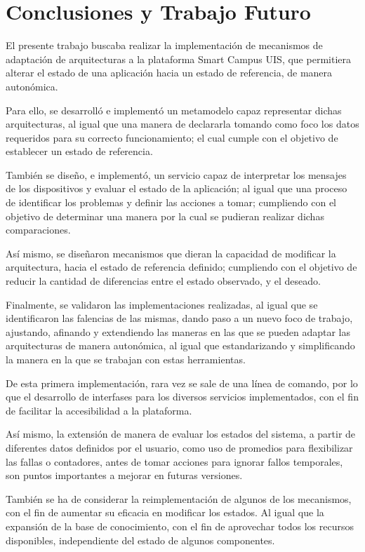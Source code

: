\newpage
\section{Conclusiones y Trabajo Futuro} \label{sec:future}

El presente trabajo buscaba realizar la implementación de mecanismos de adaptación de arquitecturas a la plataforma Smart Campus UIS, que permitiera alterar el estado de una aplicación hacia un estado de referencia, de manera autonómica.

Para ello, se desarrolló e implementó un metamodelo capaz representar dichas arquitecturas, al igual que una manera de declararla tomando como foco los datos requeridos para su correcto funcionamiento; el cual cumple con el objetivo de establecer un estado de referencia.

También se diseño, e implementó, un servicio capaz de interpretar los mensajes de los dispositivos y evaluar el estado de la aplicación; al igual que una proceso de identificar los problemas y definir las acciones a tomar; cumpliendo con el objetivo de determinar una manera por la cual se pudieran realizar dichas comparaciones.

Así mismo, se diseñaron mecanismos que dieran la capacidad de modificar la arquitectura, hacia el estado de referencia definido; cumpliendo con el objetivo de reducir la cantidad de diferencias entre el estado observado, y el deseado.

Finalmente, se validaron las implementaciones realizadas, al igual que se identificaron las falencias de las mismas, dando paso a un nuevo foco de trabajo, ajustando, afinando y extendiendo las maneras en las que se pueden adaptar las arquitecturas de manera autonómica, al igual que estandarizando y simplificando la manera en la que se trabajan con estas herramientas.

De esta primera implementación, rara vez se sale de una línea de comando, por lo que el desarrollo de interfases para los diversos servicios implementados, con el fin de facilitar la accesibilidad a la plataforma.

Así mismo, la extensión de manera de evaluar los estados del sistema, a partir de diferentes datos definidos por el usuario, como uso de promedios para flexibilizar las fallas o contadores, antes de tomar acciones para ignorar fallos temporales, son puntos importantes a mejorar en futuras versiones.

También se ha de considerar la reimplementación de algunos de los mecanismos, con el fin de aumentar su eficacia en modificar los estados. Al igual que la expansión de la base de conocimiento, con el fin de aprovechar todos los recursos disponibles, independiente del estado de algunos componentes.

